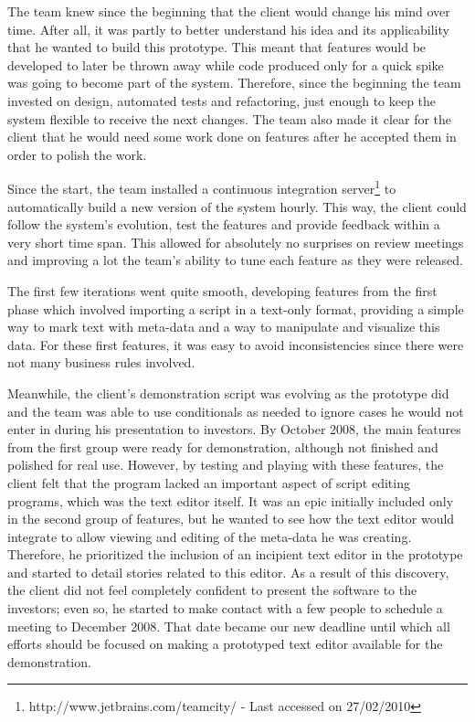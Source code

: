 \documentclass[lnbip]{svmultln}
\begin{document}
The team knew since the beginning that the client would change his
mind over time. After all, it was partly to better understand his idea
and its applicability that he wanted to build this prototype. This
meant that features would be developed to later be thrown away while
code produced only for a quick spike was going to become part of the
system. Therefore, since the beginning the team invested on design,
automated tests and refactoring, just enough to keep the system
flexible to receive the next changes. The team also made it clear for
the client that he would need some work done on features after he
accepted them in order to polish the work.

Since the start, the team installed a continuous integration
server\footnote{http://www.jetbrains.com/teamcity/ - Last accessed on
  27/02/2010} to automatically build a new version of the system
hourly. This way, the client could follow the system's evolution, test
the features and provide feedback within a very short time span. This
allowed for absolutely no surprises on review meetings and improving a
lot the team's ability to tune each feature as they were released.

The first few iterations went quite smooth, developing features from
the first phase which involved importing a script in a text-only
format, providing a simple way to mark text with meta-data and a way
to manipulate and visualize this data. For these first features, it
was easy to avoid inconsistencies since there were not many business
rules involved.

Meanwhile, the client's demonstration script was evolving as the
prototype did and the team was able to use conditionals as needed to
ignore cases he would not enter in during his presentation to
investors. By October 2008, the main features from the first group
were ready for demonstration, although not finished and polished for
real use. However, by testing and playing with these features, the
client felt that the program lacked an important aspect of script
editing programs, which was the text editor itself. It was an epic
initially included only in the second group of features, but he wanted
to see how the text editor would integrate to allow viewing and
editing of the meta-data he was creating. Therefore, he prioritized
the inclusion of an incipient text editor in the prototype and started
to detail stories related to this editor. As a result of this
discovery, the client did not feel completely confident to present the
software to the investors; even so, he started to make contact with a
few people to schedule a meeting to December 2008. That date became
our new deadline until which all efforts should be focused on making a
prototyped text editor available for the demonstration.
\end{document}
